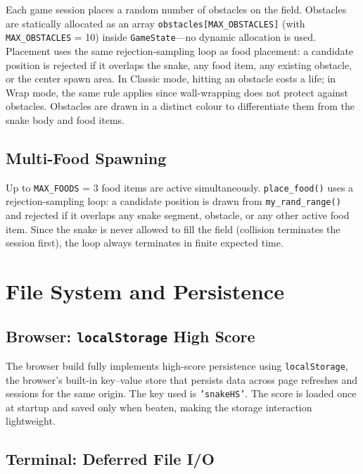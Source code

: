 \documentclass[conference]{IEEEtran}
\begin{document}
Each game session places a random number of obstacles on the field. Obstacles
are statically allocated as an array \texttt{obstacles[MAX\_OBSTACLES]} (with
\texttt{MAX\_OBSTACLES} = 10) inside \texttt{GameState}---no dynamic
allocation is used. Placement uses the same rejection-sampling loop as food
placement: a candidate position is rejected if it overlaps the snake, any food
item, any existing obstacle, or the center spawn area. In Classic mode,
hitting an obstacle costs a life; in Wrap mode, the same rule applies since
wall-wrapping does not protect against obstacles. Obstacles are drawn in a
distinct colour to differentiate them from the snake body and food items.

\subsection{Multi-Food Spawning}

Up to \texttt{MAX\_FOODS} = 3 food items are active simultaneously.
\texttt{place\_food()} uses a rejection-sampling loop: a candidate position
is drawn from \texttt{my\_rand\_range()} and rejected if it overlaps any snake
segment, obstacle, or any other active food item. Since the snake is never
allowed to fill the field (collision terminates the session first), the loop
always terminates in finite expected time.

\section{File System and Persistence}

\subsection{Browser: \texttt{localStorage} High Score}

The browser build fully implements high-score persistence using
\texttt{localStorage}, the browser's built-in key--value store that persists
data across page refreshes and sessions for the same origin. The key used is
\texttt{'snakeHS'}. The score is loaded once at startup and saved only when
beaten, making the storage interaction lightweight.

\subsection{Terminal: Deferred File I/O}
\end{document}
